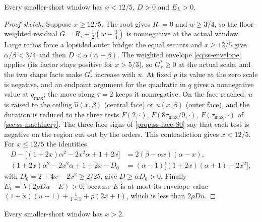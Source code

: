 \begin{proposition}[Gate S0]\label{prop:ss-S0}
Every smaller-short window has $x<12/5$, $D>0$ and $E_L>0$.
\end{proposition}

\begin{proof}[Proof sketch]
Suppose $x\ge12/5$. The root gives $R_\tau=0$ and $w\ge3/4$, so the floor-weighted residual
$G=R_\tau+\frac12(w-\frac34)$ is nonnegative at the actual window. Large ratios force a lopsided
outer bridge: the equal secants and $x\ge12/5$ give $\alpha/\beta<3/4$ and then
$D<\alpha(\alpha+\beta)$. The weighted envelope \eqref{eq:ss-envelope} applies (its factor stays
positive for $x>5/3$), so $G^*_\tau\ge0$ at the actual scale, and the two shape facts make
$G^*_\tau$ increase with $u$. At fixed $p$ its value at the zero scale is negative, and an endpoint argument
for the quadratic in $q$ gives a nonnegative value at $q_{\max}$; the move along $\tau=2$ keeps it
nonnegative. On the face reached, $u$ is raised to the ceiling $\hat u(x,\beta)$ (central face) or
$\bar u(x,\beta)$ (outer face), and the duration is reduced to the three tests $F(2,\cdot)$,
$F(8\tau_{\max}/9,\cdot)$, $F(\tau_{\max},\cdot)$ of \cref{sec:ss-machinery}. The three face
signs of \cref{prop:ss-face-S0} say that each test is negative on the region cut out by the
orders. This
contradiction gives $x<12/5$. For $x\le12/5$ the identities
\begin{align*}
  D-\bigl[(1+2x)\alpha^2-2x^2\alpha+1+2x\bigr]&=2(\beta-\alpha x)(\alpha-x),\\
  (1+2x)\alpha^2-2x^2\alpha+1+2x-D_0&=(\alpha-1)\bigl[(1+2x)(\alpha+1)-2x^2\bigr],
\end{align*}
with $D_0=2+4x-2x^2\ge2/25$, give $D\ge\alpha D_0>0$. Finally
$E_L=\lambda(2\rho Du-E)>0$, because $E$ is at most its envelope value
$(1+x)(u-1)+\frac1{1+x}+\rho(2x+1)$, which is less than $2\rho Du$.
\end{proof}

\begin{proposition}[Gate S1]\label{prop:ss-S1}
Every smaller-short window has $x>2$.
\end{proposition}

